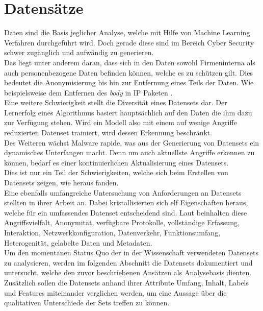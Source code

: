 \documentclass[
    12pt, %
    DIV10,
    ngerman, %
    a4paper, %
    oneside, %
    titlepage, %
    parskip=half, %
    headings=normal, %
    listof=totoc, %
    bibliography=totoc, %
    index=totoc, %
    captions=tableheading, %
    final %
]{scrreprt}
\begin{document}
\chapter{Datensätze}\label{ch:d}
Daten sind die Basis jeglicher Analyse, welche mit Hilfe von Machine Learning Verfahren durchgeführt wird. Doch gerade diese sind im Bereich Cyber Security schwer zugänglich und aufwändig zu generieren.\\ 
Das liegt unter anderem daran, dass sich in den Daten sowohl Firmeninterna als auch personenbezogene Daten befinden können, welche es zu schützen gilt. Dies bedeutet die Anonymisierung bis hin zur Entfernung eines Teils der Daten. Wie beispielsweise dem Entfernen des \emph{body} in IP Paketen \parencite{Uramova2018}.\\
Eine weitere Schwierigkeit stellt die Diversität eines Datensets dar. Der Lernerfolg eines Algorithmus basiert hauptsächlich auf den Daten die ihm dazu zur Verfügung stehen. Wird ein Modell also mit einem auf wenige Angriffe reduzierten Datenset trainiert, wird dessen Erkennung beschränkt.\\
Des Weiteren wächst Malware rapide, was aus der Generierung von Datensets ein dynamisches Unterfangen macht. Denn um auch aktuellste Angriffe erkennen zu können, bedarf es einer kontinuierlichen Aktualisierung eines Datensets.\\
Dies ist nur ein Teil der Schwierigkeiten, welche sich beim Erstellen von Datensets zeigen, wie \textcite{Uramova2018} heraus fanden.\\
Eine ebenfalls umfangreiche Untersuchung von Anforderungen an Datensets stellten \textcite{7885840} in ihrer Arbeit an. Dabei kristallisierten sich elf Eigenschaften heraus, welche für ein umfassendes Datenset entscheidend sind. Laut \textcite{7885840} beinhalten diese Angriffsvielfalt, Anonymität, verfügbare Protokolle, vollständige Erfassung, Interaktion, Netzwerkkonfiguration, Datenverkehr, Funktionsumfang, Heterogenität, gelabelte Daten und Metadaten.\\
Um den momentanen Status Quo der in der Wissenschaft verwendeten Datensets zu analysieren, werden im folgenden Abschnitt die Datensets dokumentiert und untersucht, welche den zuvor beschriebenen Ansätzen als Analysebasis dienten. Zusätzlich sollen die Datensets anhand ihrer Attribute Umfang, Inhalt, Labels und Features miteinander verglichen werden, um eine Aussage über die qualitativen Unterschiede der Sets treffen zu können.
\end{document}
